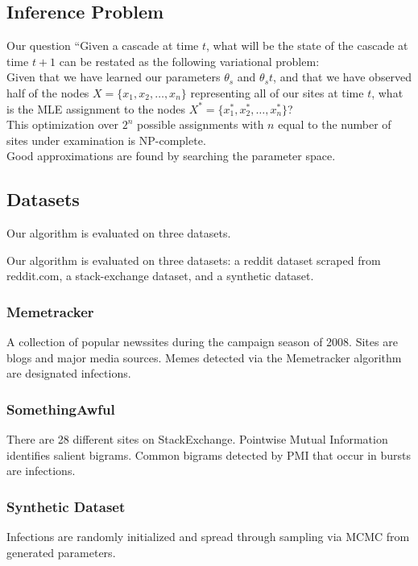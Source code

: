 \documentclass{article} %
\begin{document}
\subsection{Inference Problem}
Our question “Given a cascade at time $t$, what will be the state of the cascade at time $t+1$ can be restated as the following variational problem:\\
Given that we have learned our parameters $\theta_s$ and $\theta_st$, and that we have observed half of the nodes $X=\{x_1 ,x_2,\dots,x_n\}$ representing all of our sites at time $t$, what is the MLE assignment to the nodes $X^*=\{x^*_1 ,x^*_2,\dots,x^*_n\}$?\\
This optimization over $2^n$ possible assignments with $n$ equal to the number of sites under examination is NP-complete.\\
Good approximations are found by searching the parameter space. 


\subsection{Datasets}
\label{data}

Our algorithm is evaluated on three datasets.

Our algorithm is evaluated on three datasets: a reddit dataset scraped from reddit.com, a stack-exchange dataset, and a synthetic dataset.

\subsubsection{Memetracker}

A collection of popular newssites during the campaign season of 2008. Sites are blogs and major media sources. Memes detected via the Memetracker algorithm \cite{memetracker} are designated infections.

\subsubsection{SomethingAwful}
 There are 28 different sites on StackExchange. Pointwise Mutual Information \cite{pmi} identifies salient bigrams. Common bigrams detected by PMI that occur in bursts are infections.
\subsubsection{Synthetic Dataset}
Infections are randomly initialized and spread through sampling via MCMC from generated parameters.
\end{document}
